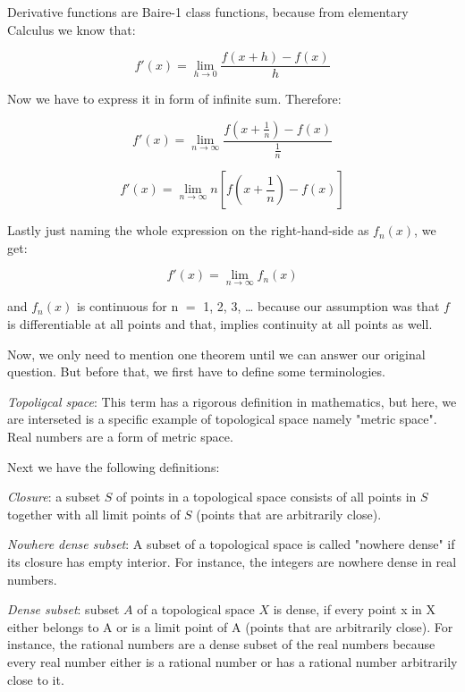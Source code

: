 \documentclass[11pt]{article}
\begin{document}
Derivative functions are Baire-1 class functions, because from elementary Calculus we know that:

\begin{equation}
  f'(x) = \lim_{h\to0} \frac{f(x + h) - f(x)}{h}
\end{equation}

Now we have to express it in form of infinite sum. Therefore:

\begin{equation}
  f'(x) = \lim_{n\to\infty} \frac{f(x + \frac{1}{n}) - f(x)}{\frac{1}{n}}
\end{equation}

\begin{equation}
  f'(x) = \lim_{n\to\infty} n [f(x + \frac{1}{n}) - f(x)]
\end{equation}

Lastly just naming the whole expression on the right-hand-side as \(f_n(x)\), we get:

\begin{equation}
  f'(x) = \lim_{n\to\infty} {f_n(x)}
\end{equation}

and \(f_n(x)\) is continuous for n \(=\) 1, 2, 3, \ldots{} because our assumption was that \(f\) is differentiable at all points and that, implies continuity at all points as well.

Now, we only need to mention one theorem until we can answer our original question. But before that, we first have to define some terminologies.

\emph{Topoligcal space}: This term has a rigorous definition in mathematics, but here, we are interseted is a specific example of topological space namely "metric space".
Real numbers are a form of metric space.

Next we have the following definitions:

\emph{Closure}: a subset \(S\) of points in a topological space consists of all points in \(S\) together with all limit points of \(S\) (points that are arbitrarily close).

\emph{Nowhere dense subset}: A subset of a topological space is called "nowhere dense" if its closure has empty interior.
For instance, the integers are nowhere dense in real numbers.

\emph{Dense subset}:  subset \(A\) of a topological space \(X\) is dense, if every point x in X either belongs to A or is a limit point of A (points that are arbitrarily close).
For instance, the rational numbers are a dense subset of the real numbers because every real number either is a rational number or has a rational number arbitrarily close to it.
\end{document}
